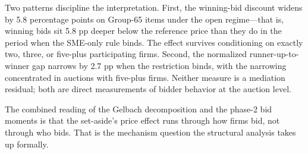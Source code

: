 

Two patterns discipline the interpretation. First, the winning-bid discount widens by 5.8 percentage points on Group-65 items under the open regime---that is, winning bids sit 5.8 pp deeper below the reference price than they do in the period when the SME-only rule binds. The effect survives conditioning on exactly two, three, or five-plus participating firms. Second, the normalized runner-up-to-winner gap narrows by 2.7 pp when the restriction binds, with the narrowing concentrated in auctions with five-plus firms. Neither measure is a mediation residual; both are direct measurements of bidder behavior at the auction level.

The combined reading of the Gelbach decomposition and the phase-2 bid moments is that the set-aside's price effect runs through how firms bid, not through who bids. That is the mechanism question the structural analysis takes up formally.
